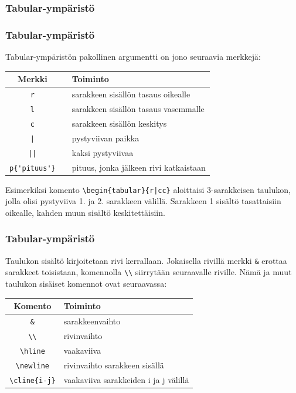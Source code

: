 \documentclass[handout]{beamer}
\theoremstyle{remark}
\newcommand{\vaihto}{\\ \vspace{10pt}}
\begin{document}
\subsubsection{Tabular-ympäristö}
\begin{frame}[fragile]
\frametitle{Tabular-ympäristö}
Tabular-ympäristön pakollinen argumentti on jono seuraavia merkkejä:
\begin{table}[h!]
\begin{scriptsize}
\begin{tabular}{ccp{5cm}}
Merkki && Toiminto\\
\hline
\verb-r- && sarakkeen sisällön tasaus oikealle\\
\hline
\verb-l- && sarakkeen sisällön tasaus vasemmalle\\
\hline
\verb-c- && sarakkeen sisällön keskitys\\
\hline
\verb-|- && pystyviivan paikka\\
\hline
\verb-||- && kaksi pystyviivaa\\
\hline
\verb-p{'pituus'}- && pituus, jonka jälkeen rivi katkaistaan\\
\hline
\end{tabular}
\end{scriptsize}
\end{table}
Esimerkiksi komento \verb-\begin{tabular}{r|cc}- aloittaisi 3-sarakkeisen taulukon, jolla olisi pystyviiva 1. ja 2. sarakkeen välillä. Sarakkeen 1 sisältö tasattaisiin oikealle, kahden muun sisältö keskitettäisiin.
\end{frame}

\begin{frame}[fragile]
\frametitle{Tabular-ympäristö}
Taulukon sisältö kirjoitetaan rivi kerrallaan. Jokaisella rivillä merkki \verb-&- erottaa sarakkeet toisistaan, komennolla \verb-\\- siirrytään seuraavalle riville.  Nämä ja muut taulukon sisäiset komennot ovat seuraavassa:
\vaihto
\begin{table}[h!]
\begin{scriptsize}
\begin{tabular}{cp{4cm}}
Komento & Toiminto\\
\hline
\verb-&- & sarakkeenvaihto\\
\hline
\verb-\\- & rivinvaihto\\
\hline
\verb-\hline- & vaakaviiva \\
\hline
\verb-\newline- & rivinvaihto sarakkeen sisällä\\
\hline
\verb+\cline{i-j}+ & vaakaviiva sarakkeiden i ja j välillä\\
\hline
\end{tabular}
\end{scriptsize}
\end{table}
 
\end{frame}
\end{document}

